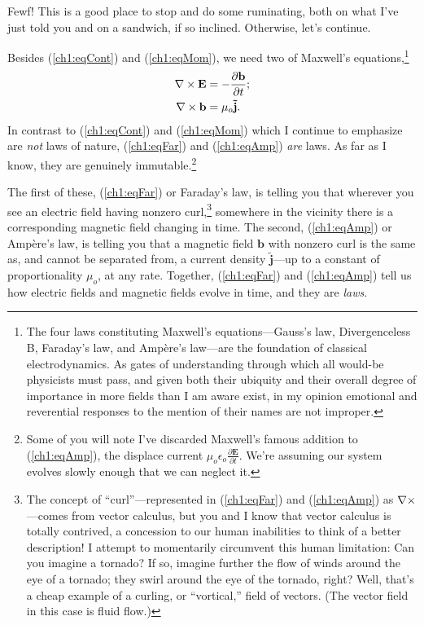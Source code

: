 Fewf! This is a good place to stop and do some ruminating, both on what I've
just told you and on a sandwich, if so inclined. Otherwise, let's continue.

Besides (\ref{ch1:eqCont}) and (\ref{ch1:eqMom}), we need two of Maxwell's
equations,\footnote{The four laws constituting Maxwell's equations---Gauss's
  law, Divergenceless B, Faraday's law, and Amp\`{e}re's law---are the
  foundation of classical electrodynamics. As gates of understanding through
  which all would-be physicists must pass, and given both their ubiquity and
  their overall degree of importance in more fields than I am aware exist, in my
  opinion emotional and reverential responses to the mention of their names are
  not improper.}
\begin{subequations}
  \begin{align} {\bf \nabla} \times \mathbf{E} &= - \dfrac{\partial \mathbf{b}}{\partial t}; \label{ch1:eqFar} \\
    {\bf \nabla} \times \mathbf{b} &= \mu_o \mathbf{\tilde j}. \label{ch1:eqAmp}
  \end{align}
\end{subequations}
In contrast to (\ref{ch1:eqCont}) and (\ref{ch1:eqMom}) which I continue to
emphasize are \emph{not} laws of nature, (\ref{ch1:eqFar}) and (\ref{ch1:eqAmp})
\emph{are} laws. As far as I know, they are genuinely immutable.\footnote{Some
  of you will note I've discarded Maxwell's famous addition to
  (\ref{ch1:eqAmp}), the displace current $\mu_o \epsilon_o \frac{\partial
    \mathbf{E}}{\partial t}$. We're assuming our system evolves slowly enough
  that we can neglect it.}

The first of these, (\ref{ch1:eqFar}) or Faraday's law, is telling you that
wherever you see an electric field having nonzero curl,\footnote{The concept of
  ``curl''---represented in (\ref{ch1:eqFar}) and (\ref{ch1:eqAmp}) as ${\bf \nabla}
  \times$---comes from vector calculus, but you and I know that vector calculus
  is totally contrived, a concession to our human inabilities to think of a
  better description! I attempt to momentarily circumvent this human limitation:
  Can you imagine a tornado? If so, imagine further the flow of winds around the
  eye of a tornado; they swirl around the eye of the tornado, right? Well,
  that's a cheap example of a curling, or ``vortical,'' field of vectors. (The
  vector field in this case is fluid flow.) } somewhere in the vicinity there is
a corresponding magnetic field changing in time. The second, (\ref{ch1:eqAmp})
or Amp\`{e}re's law, is telling you that a magnetic field $\mathbf{b}$ with
nonzero curl is the same as, and cannot be separated from, a current density
$\mathbf{\tilde j}$---up to a constant of proportionality $\mu_o$, at any
rate. Together, (\ref{ch1:eqFar}) and (\ref{ch1:eqAmp}) tell us how electric
fields and magnetic fields evolve in time, and they are \emph{laws}. 

